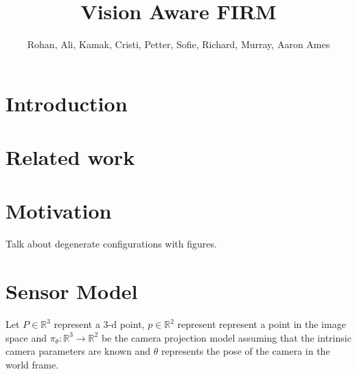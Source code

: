 \documentclass[conference]{IEEEtran}
\begin{document}

\title{\huge Vision Aware FIRM}

\author{Rohan, Ali, Kamak, Cristi, Petter, Sofie, Richard, Murray, Aaron Ames}

\maketitle

\begin{abstract}
\end{abstract}



\section{Introduction}

\section{Related work}
\cite{achtelik2014motion}

\cite{costante2018exploiting}

\cite{perception-aware-planning} 

\cite{Perception-Aware-Multiobjective-Search}

\cite{MapQualityEvaluation}

\section{Motivation}
Talk about degenerate configurations with figures.

\section{Sensor Model}

Let $P \in \mathbb{R}^{3}$ represent a 3-d point, $p \in \mathbb{R}^2$ represent represent a point in the image space and $\pi_\theta:\mathbb{R}^3\to\mathbb{R}^2$ be the camera projection model assuming that the intrinsic camera parameters are known and $\theta$ represents the pose of the camera in the world frame.
\end{document}
